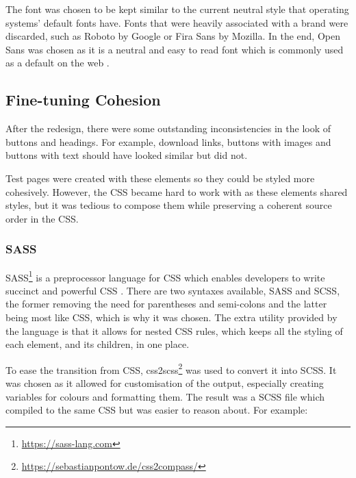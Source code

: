 \documentclass[bsc,frontabs,oneside,singlespacing,parskip,deptreport,logo]{infthesis}
\begin{document}
The font was chosen to be kept similar to the current neutral style that operating systems' default  fonts have. Fonts that were heavily associated with a brand were discarded, such as Roboto by Google or Fira Sans by Mozilla. In the end, Open Sans was chosen as it is a neutral and easy to read font which is commonly used as a default on the web \cite{stevens_open_2012}. %

\subsection{Fine-tuning Cohesion}

After the redesign, there were some outstanding inconsistencies in the look of buttons and headings. For example, download links, buttons with images and buttons with text should have looked similar but did not.

Test pages were created with these elements so they could be styled more cohesively. However, the CSS became  hard to work with as these elements shared styles, but it was tedious to compose them while preserving a coherent source order in the CSS.

\subsubsection{SASS}

SASS\footnote{\url{https://sass-lang.com}} is a preprocessor language for CSS which enables developers to write succinct and powerful CSS \cite{mazinanian2016empirical}. There are two syntaxes available, SASS and SCSS, the former removing the need for parentheses and semi-colons and the latter being most like CSS, which is why it was chosen. The extra utility provided by the language is that it allows for nested CSS rules, which keeps all the styling of each element, and its children, in one place.


To ease the transition from CSS, css2scss\footnote{\url{https://sebastianpontow.de/css2compass/}} was used to convert it into SCSS. It was chosen as it allowed for customisation of the output, especially creating variables for colours and formatting them. The result was a SCSS file which compiled to the same CSS but was easier to reason about. For example:
\end{document}
